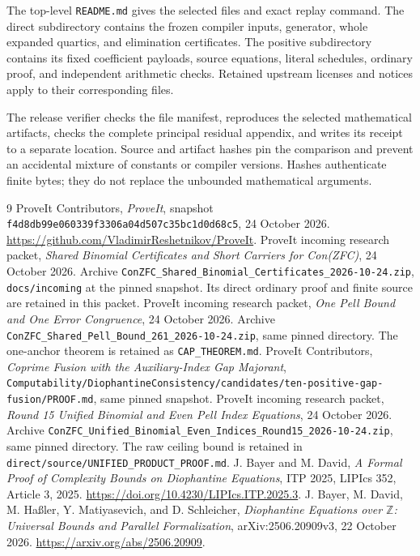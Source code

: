 \documentclass[11pt,letterpaper]{article}
\newcommand{\Z}{\mathbb Z}
\newcommand{\pathfile}[1]{\nolinkurl{#1}}
\theoremstyle{remark}\newtheorem{remark}[theorem]{Remark}
\begin{document}
The top-level \pathfile{README.md} gives the selected files and exact
replay command.  The direct subdirectory contains the frozen compiler
inputs, generator, whole expanded quartics, and elimination certificates.
The positive subdirectory contains its fixed coefficient payloads,
source equations, literal schedules, ordinary proof, and independent
arithmetic checks.  Retained upstream licenses and notices apply to
their corresponding files.

The release verifier checks the file manifest, reproduces the selected
mathematical artifacts, checks the complete principal residual appendix,
and writes its receipt to a separate location.  Source and artifact
hashes pin the comparison and prevent an accidental mixture of constants
or compiler versions.  Hashes authenticate finite bytes; they do not
replace the unbounded mathematical arguments.

\begingroup\small
\begin{thebibliography}{9}
\setlength{\itemsep}{2pt}\setlength{\parskip}{0pt}
 ProveIt Contributors, \emph{ProveIt}, snapshot
\pathfile{f4d8db99e060339f3306a04d507c35bc1d0d68c5}, 24 October 2026.
\url{https://github.com/VladimirReshetnikov/ProveIt}.
 ProveIt incoming research packet,
\emph{Shared Binomial Certificates and Short Carriers for Con(ZFC)},
24 October 2026.  Archive
\pathfile{ConZFC_Shared_Binomial_Certificates_2026-10-24.zip},
\pathfile{docs/incoming} at the pinned snapshot.  Its direct ordinary
proof and finite source are retained in this packet.
 ProveIt incoming research packet,
\emph{One Pell Bound and One Error Congruence}, 24 October 2026.
Archive \pathfile{ConZFC_Shared_Pell_Bound_261_2026-10-24.zip},
same pinned directory.  The one-anchor theorem is retained as
\pathfile{CAP_THEOREM.md}.
 ProveIt Contributors,
\emph{Coprime Fusion with the Auxiliary-Index Gap Majorant},
\pathfile{Computability/DiophantineConsistency/candidates/ten-positive-gap-fusion/PROOF.md},
same pinned snapshot.
 ProveIt incoming research packet,
\emph{Round 15 Unified Binomial and Even Pell Index Equations},
24 October 2026. Archive
\pathfile{ConZFC_Unified_Binomial_Even_Indices_Round15_2026-10-24.zip},
same pinned directory. The raw ceiling bound is retained in
\pathfile{direct/source/UNIFIED_PRODUCT_PROOF.md}.
 J. Bayer and M. David,
\emph{A Formal Proof of Complexity Bounds on Diophantine Equations},
ITP 2025, LIPIcs 352, Article 3, 2025.
\url{https://doi.org/10.4230/LIPIcs.ITP.2025.3}.
 J. Bayer, M. David, M. Ha{\ss}ler, Y. Matiyasevich,
and D. Schleicher, \emph{Diophantine Equations over $\Z$: Universal Bounds
and Parallel Formalization}, arXiv:2506.20909v3, 22 October 2026.
\url{https://arxiv.org/abs/2506.20909}.
\end{thebibliography}
\endgroup
\end{document}
